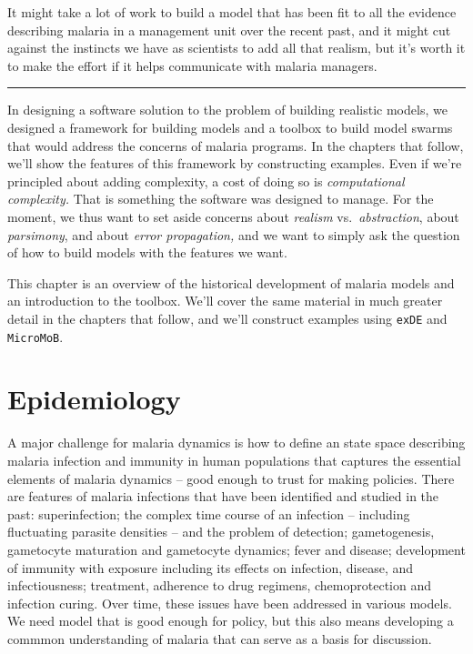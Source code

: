 \documentclass[
]{book}
\begin{document}
It might take a lot of work to build a model that has been fit to all the evidence describing malaria in a management unit over the recent past, and it might cut against the instincts we have as scientists to add all that realism, but it's worth it to make the effort if it helps communicate with malaria managers.

\begin{center}\rule{0.5\linewidth}{0.5pt}\end{center}

In designing a software solution to the problem of building realistic models, we designed a framework for building models and a toolbox to build model swarms that would address the concerns of malaria programs. In the chapters that follow, we'll show the features of this framework by constructing examples. Even if we're principled about adding complexity, a cost of doing so is \emph{computational complexity.} That is something the software was designed to manage. For the moment, we thus want to set aside concerns about \emph{realism} vs.~\emph{abstraction}, about \emph{parsimony}, and about \emph{error propagation,} and we want to simply ask the question of how to build models with the features we want.

This chapter is an overview of the historical development of malaria models and an introduction to the toolbox. We'll cover the same material in much greater detail in the chapters that follow, and we'll construct examples using \texttt{exDE} and \texttt{MicroMoB}.

\hypertarget{epidemiology}{%
\section{Epidemiology}\label{epidemiology}}

A major challenge for malaria dynamics is how to define an state space describing malaria infection and immunity in human populations that captures the essential elements of malaria dynamics -- good enough to trust for making policies. There are features of malaria infections that have been identified and studied in the past: superinfection; the complex time course of an infection -- including fluctuating parasite densities -- and the problem of detection; gametogenesis, gametocyte maturation and gametocyte dynamics; fever and disease; development of immunity with exposure including its effects on infection, disease, and infectiousness; treatment, adherence to drug regimens, chemoprotection and infection curing. Over time, these issues have been addressed in various models. We need model that is good enough for policy, but this also means developing a commmon understanding of malaria that can serve as a basis for discussion.
\end{document}
